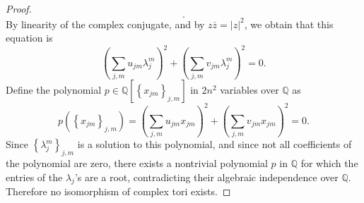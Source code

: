 \documentclass[11pt, letterpaper]{article}
\theoremstyle{plain}
\begin{document}
\begin{proof}
\[	.\]
	By linearity of the complex conjugate, and by $z \overline{z} =\left| z \right| ^2$, we obtain that this equation is
	\[
		\left( \sum_{j,m} u_{jm} \lambda _j^m \right) ^2 + \left( \sum_{j,m} v_{jm} \lambda _j^m \right) ^2=0
	.\]
	Define the polynomial $p\in\mathbb{Q} [\left\{ x_{jm}  \right\}_{j,m} ]$ in $2n^2$ variables over $\mathbb{Q} $ as
	\[
		p(\left\{ x_{jm}  \right\}_{j,m} ) = \left( \sum_{j,m} u_{jm} x_{jm} \right) ^2 + \left( \sum_{j,m} v_{jm} x_{jm}  \right)^2=0
	.\]
	Since $\left\{ \lambda _j^m \right\} _{j,m} $ is a solution to this polynomial, and since not all coefficients of the polynomial are zero, there exists a nontrivial polynomial $p$ in $\mathbb{Q} $ for which the entries of the $\lambda _j$'s are a root, contradicting their algebraic independence over $\mathbb{Q} $. Therefore no isomorphism of complex tori exists.
\end{proof}
\end{document}
